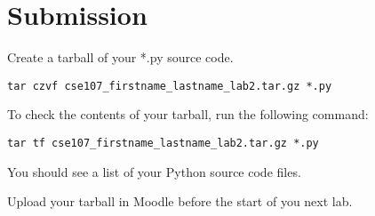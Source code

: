 \documentclass[12pt]{article}
\begin{document}





\section*{Submission}

Create a tarball of your *.py source code.

\begin{lstlisting}[style=bash]
tar czvf cse107_firstname_lastname_lab2.tar.gz *.py
\end{lstlisting}


To check the contents of your tarball, run the following command:

\begin{lstlisting}[style=bash]
tar tf cse107_firstname_lastname_lab2.tar.gz *.py
\end{lstlisting}

You should see a list of your Python source code files.

Upload your tarball in Moodle before the start of you next lab.
\end{document}
